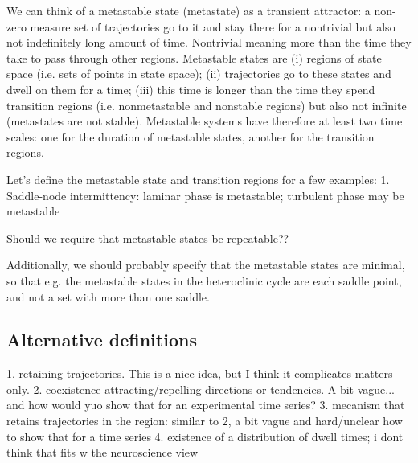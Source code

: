 \documentclass[preprint,superscriptaddress,showpacs,amsmath,amssymb,aps,pre,floatfix]{revtex4-1}
\theoremstyle{definition}
\begin{document}
We can think of a metastable state (metastate) as a transient attractor: a non-zero measure set of trajectories go to it and stay there for a nontrivial but also not indefinitely long amount of time. Nontrivial meaning more than the time they take to pass through other regions.
Metastable states are (i) regions of state space (i.e. sets of points in state space); (ii) trajectories go to these states and dwell on them for a time; (iii) this time is longer than the time they spend transition regions (i.e. nonmetastable and nonstable regions) but also not infinite (metastates are not stable). Metastable systems have therefore at least two time scales: one for the duration of metastable states, another for the transition regions. 

Let's define the metastable state and transition regions for a few examples:
1. Saddle-node intermittency: laminar phase is metastable; turbulent phase may be metastable




Should we require that metastable states be repeatable??

Additionally, we should probably specify that the metastable states are minimal, so that e.g. the metastable states in the heteroclinic cycle are each saddle point, and not a set with more than one saddle. 

\subsection{Alternative definitions}
1. retaining trajectories. This is a nice idea, but I think it complicates matters only.
2. coexistence attracting/repelling directions or tendencies. A bit vague... and how would yuo show that for an experimental time series?
3. mecanism that retains trajectories in the region: similar to 2, a bit vague and hard/unclear how to show that for a time series
4. existence of a distribution of dwell times; i dont think that fits w the neuroscience view


\end{document}
